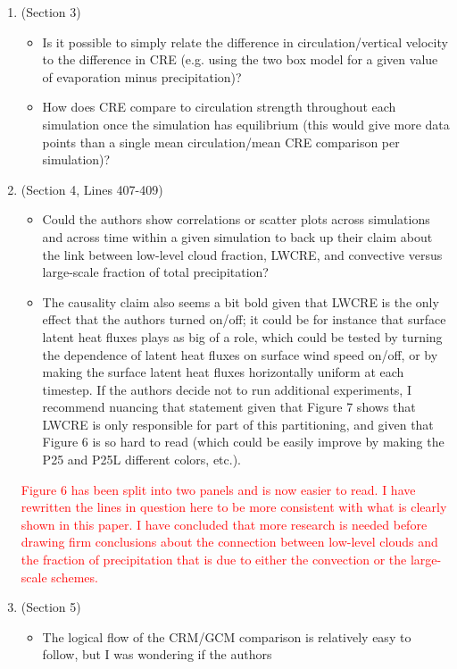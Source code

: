 \documentclass[draft]{agujournal2019}
\begin{document}
\begin{enumerate}
  \item (Section 3)
    \begin{itemize}
      \item Is it possible to simply relate the difference in circulation/vertical velocity to the difference in CRE (e.g. using the
two box model for a given value of evaporation minus precipitation)?
      \item How does CRE compare to circulation strength throughout each simulation once the simulation has equilibrium
(this would give more data points than a single mean circulation/mean CRE comparison per simulation)?
    \end{itemize}
  \item (Section 4, Lines 407-409)
    \begin{itemize}
      \item Could the authors show correlations or scatter plots across simulations and across time within a given simulation
to back up their claim about the link between low-level cloud fraction, LWCRE, and convective versus large-scale
fraction of total precipitation?
      \item The causality claim also seems a bit bold given that LWCRE is the only effect that the authors turned on/off; it could
be for instance that surface latent heat fluxes plays as big of a role, which could be tested by turning the dependence
of latent heat fluxes on surface wind speed on/off, or by making the surface latent heat fluxes horizontally uniform
at each timestep. If the authors decide not to run additional experiments, I recommend nuancing that statement
given that Figure 7 shows that LWCRE is only responsible for part of this partitioning, and given that Figure 6 is
so hard to read (which could be easily improve by making the P25 and P25L different colors, etc.).
    \end{itemize}
  \textcolor{red}{Figure 6 has been split into two panels and is now easier to read.  I have rewritten the lines in question here to be more consistent
  with what is clearly shown in this paper.  I have concluded that more research is needed before drawing firm conclusions about the connection 
  between low-level clouds and the fraction of precipitation that is due to either the convection or the large-scale schemes.}
  \item (Section 5)
    \begin{itemize}
      \item The logical flow of the CRM/GCM comparison is relatively easy to follow, but I was wondering if the authors

\end{itemize}
\end{enumerate}
\end{document}
